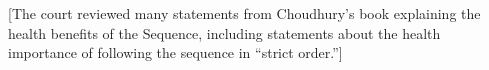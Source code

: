[The court reviewed many statements from Choudhury's book explaining the health
benefits of the Sequence, including statements about the
health importance of following the sequence in ``strict order.'']

%

